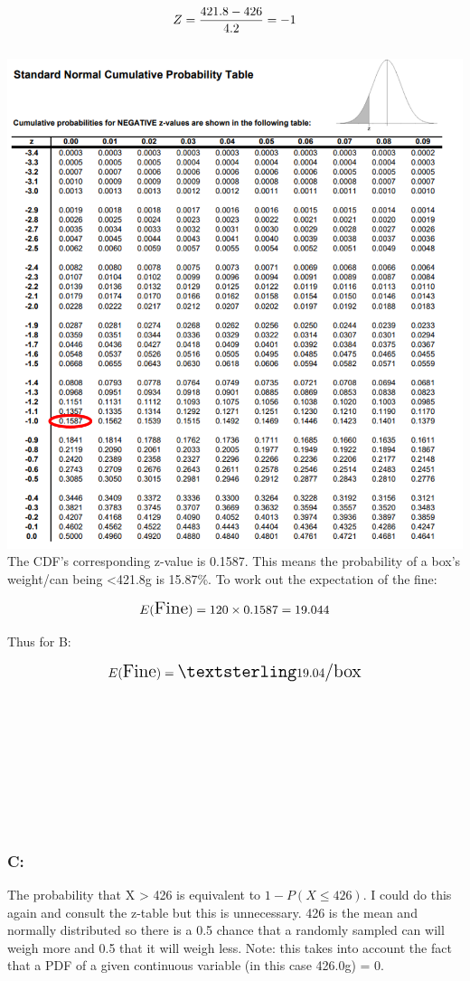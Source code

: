 \documentclass[
]{article}
\begin{document}
\[
\Large
Z = \frac{421.8 - 426}{4.2} = -1
\]\\

\includegraphics{images/ztableb.png}\\
The CDF's corresponding z-value is 0.1587. This means the probability of
a box's weight/can being \textless421.8g is 15.87\%. To work out the
expectation of the fine:

\[
\Large
E(\text{Fine}) = 120 \times 0.1587 = 19.044
\]

Thus for B:

\[
\Large
E(\text{Fine})=£19.04\text{/box}
\]\\
\strut \\
\strut \\
\strut \\
\strut \\

\subsubsection{C:}\label{c}

The probability that X \textgreater{} 426 is equivalent to
\(1- P(X ≤ 426)\). I could do this again and consult the z-table but
this is unnecessary. 426 is the mean and normally distributed so there
is a 0.5 chance that a randomly sampled can will weigh more and 0.5 that
it will weigh less. Note: this takes into account the fact that a PDF of
a given continuous variable (in this case 426.0g) = 0.
\end{document}
